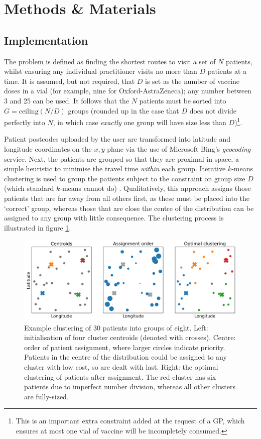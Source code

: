 \documentclass[review]{elsarticle}
\begin{document}
\section{Methods \& Materials}
\subsection{Implementation}

The problem is defined as finding the shortest routes to visit a set of $N$ patients, whilst ensuring any individual practitioner visits no more than $D$ patients at a time. It is assumed, but not required, that $D$ is set as the number of vaccine doses in a vial (for example, nine for Oxford-AstraZeneca); any number between 3 and 25 can be used. It follows that the $N$ patients must be sorted into $G = \mathrm{ceiling}(N / D)$ groups (rounded up in the case that $D$ does not divide perfectly into $N$, in which case \textit{exactly} one group will have size less than $D$)\footnote{This is an important extra constraint added at the request of a GP, which ensures at most one vial of vaccine will be incompletely consumed.}. 

Patient postcodes uploaded by the user are transformed into latitude and longitude coordinates on the $x,y$ plane via the use of Microsoft Bing's \textit{geocoding} service. Next, the patients are grouped so that they are proximal in space, a simple heuristic to minimise the travel time \textit{within} each group. Iterative $k$-means clustering is used to group the patients subject to the constraint on group size $D$ (which standard $k$-means cannot do) \cite{macqueen1967some, davidson2005clustering}. Qualitatively, this approach assigns those patients that are far away from all others first, as these must be placed into the `correct' group, whereas those that are close the centre of the distribution can be assigned to any group with little consequence. The clustering process is illustrated in figure \ref{clustering}. 

\begin{figure}[htbp]
\centering
\includegraphics[width=\textwidth]{clustering_demo.png}
\caption{Example clustering of 30 patients into groups of eight. Left: initialisation of four cluster centroids (denoted with crosses). Centre: order of patient assignment, where larger circles indicate priority. Patients in the centre of the distribution could be assigned to any cluster with low cost, so are dealt with last. Right: the optimal clustering of patients after assignment. The red cluster has six patients due to imperfect number division, whereas all other clusters are fully-sized.}
\label{clustering}
\end{figure}
\end{document}
